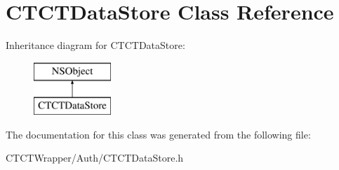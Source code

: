 \hypertarget{interface_c_t_c_t_data_store}{\section{C\-T\-C\-T\-Data\-Store Class Reference}
\label{interface_c_t_c_t_data_store}
}
Inheritance diagram for C\-T\-C\-T\-Data\-Store\-:\begin{figure}[H]
\begin{center}
\leavevmode
\includegraphics[height=2.000000cm]{interface_c_t_c_t_data_store}
\end{center}
\end{figure}


The documentation for this class was generated from the following file\-:\begin{DoxyCompactItemize}
\item 
C\-T\-C\-T\-Wrapper/\-Auth/C\-T\-C\-T\-Data\-Store.\-h\end{DoxyCompactItemize}
